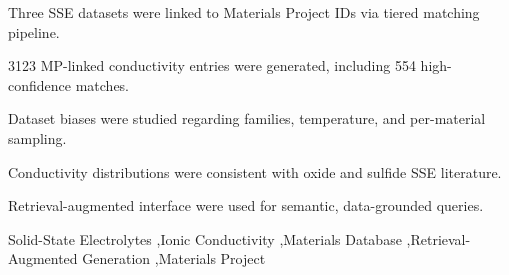 \documentclass[a4paper,fleqn]{cas-sc}
\begin{document}
   





\begin{highlights}
\item Three SSE datasets were linked to Materials Project IDs via tiered matching pipeline.
\item 3123 MP-linked conductivity entries were generated, including 554 high-confidence matches.
\item Dataset biases were studied regarding families, temperature, and per-material sampling.
\item Conductivity distributions were consistent with oxide and sulfide SSE literature.
\item Retrieval-augmented interface were used for semantic, data-grounded queries.
\end{highlights}

\begin{keywords}
    Solid-State Electrolytes
    \sep Ionic Conductivity
    \sep Materials Database
    \sep Retrieval-Augmented Generation
    \sep Materials Project
\end{keywords}
\end{document}
